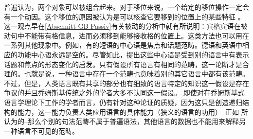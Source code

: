 普遍认为，两个对象可以被组合起来\citep[]{Chomsky95a-u}。对于移位来说，一个给定的移位操作一定会有一个动因。这个移位的原因被认为是可以核查它要移到的位置上的某些特征
。这一观点早在\ref{Abschnitt-GB-Passiv}有关被动的分析中就有所说明：宾格宾语在被动句中不能带有格信息，进而必须移到能够接收格的位置上。这类方法也可以用在一系列其他现象中。例如，有的短语的中心语是焦点和话题范畴。德语和英语中相应的功能中心语永远是空的。尽管如此，提出这些中心语是受到别的语言中有表示话题和焦点的形态变化的启发。只有假设所有语言有相同的范畴，这一论断才是合理的。也就是说，一种语言中存在一个范畴也意味着别的其它语言中都有该范畴。不过，但是，人类语言既有共享的部分也有细致的语言特定的知识这一假设是存在争议的并且乔姆斯基传统之外的学者大多不认同这一假设。 即使对在乔姆斯基式语言学理论下工作的学者而言，仍有针对这种论证的质疑，因为这只是创造递归结构的能力，这一能力负责人类应用语言的具体能力（狭义的语言的功用）--正如 \citet*{HCF2002a}所认为的--那么个别的句法范畴不属于普遍语法，其他语言的数据也不能用来解释另一种语言不可见的范畴。

